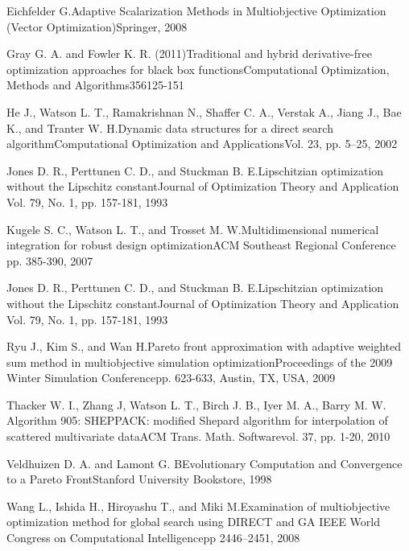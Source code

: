 {Eichfelder G.}{Adaptive Scalarization Methods in Multiobjective Optimization 
(Vector Optimization)}{Springer, 2008}

{Gray G. A. and Fowler K. R. (2011)}{Traditional and hybrid derivative-free 
optimization approaches for black box functions}{Computational Optimization, 
Methods and Algorithms}{356}{125-151}

{He J., Watson L. T., Ramakrishnan N., Shaffer C. A., Verstak A., Jiang J., 
Bae K., and Tranter W. H.}{Dynamic data structures for a direct search 
algorithm}{Computational Optimization and Applications}{Vol. 23, pp. 5--25, 
2002} 

{Jones D. R., Perttunen  C. D., and Stuckman B. E.}{Lipschitzian optimization
without the Lipschitz constant}{Journal of Optimization Theory and Application} 
{Vol. 79, No. 1, pp. 157-181, 1993}

{Kugele S. C., Watson L. T., and Trosset M. W.}{Multidimensional numerical 
integration for robust design optimization}{ACM Southeast Regional Conference}
{pp. 385-390, 2007}

{Jones D. R., Perttunen  C. D., and Stuckman B. E.}{Lipschitzian optimization
without the Lipschitz constant}{Journal of Optimization Theory and Application} 
{Vol. 79, No. 1, pp. 157-181, 1993}

{Ryu J., Kim S., and Wan H.}{Pareto front approximation with adaptive weighted 
sum method in multiobjective simulation optimization}{Proceedings of the 2009
Winter Simulation Conference}{pp. 623-633, Austin, TX, USA, 2009}

{Thacker W. I., Zhang J, Watson L. T., Birch J. B., Iyer M. A., Barry M. W.}
{Algorithm 905: SHEPPACK: modified Shepard algorithm for interpolation of 
scattered multivariate data}{ACM Trans. Math. Software}{vol. 37, pp. 1-20, 
2010}

{Veldhuizen D. A. and Lamont G. B}{Evolutionary Computation and 
Convergence to a Pareto Front}{Stanford University Bookstore, 1998}

{Wang L., Ishida H., Hiroyashu T., and Miki M.}{Examination of 
multiobjective optimization method for global search using DIRECT and GA}
{IEEE World Congress on Computational Intelligence}{pp 2446--2451, 2008}

\bye

